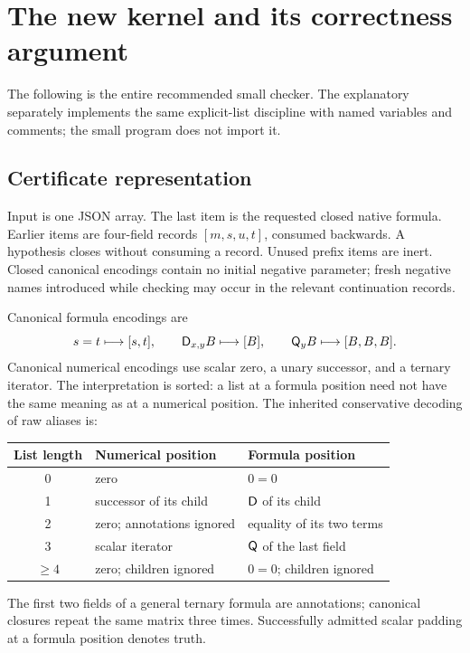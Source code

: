 \section{The new kernel and its correctness argument}
\label{sec:kernel}

The following is the entire recommended small checker. The explanatory
 separately implements the same explicit-list
discipline with named variables and comments; the small program does not
import it.


\subsection{Certificate representation}

Input is one JSON array. The last item is the requested closed native
formula. Earlier items are four-field records $[m,s,u,t]$, consumed
backwards. A hypothesis closes without consuming a record. Unused prefix
items are inert. Closed canonical encodings contain no initial negative
parameter; fresh negative names introduced while checking may occur in
the relevant continuation records.

Canonical formula encodings are
\[
  s=t\longmapsto[s,t],\qquad
  \mathsf D_{x,y}B\longmapsto[B],\qquad
  \mathsf Q_yB\longmapsto[B,B,B].
\]
Canonical numerical encodings use scalar zero, a unary successor, and
a ternary iterator. The interpretation is sorted: a list at a formula
position need not have the same meaning as at a numerical position.
The inherited conservative decoding of raw aliases is:
\begin{center}
\small
\begin{tabular}{cll}
\toprule
List length & Numerical position & Formula position\\
\midrule
0 & zero & $0=0$\\
1 & successor of its child & $\mathsf D$ of its child\\
2 & zero; annotations ignored & equality of its two terms\\
3 & scalar iterator & $\mathsf Q$ of the last field\\
$\geq4$ & zero; children ignored & $0=0$; children ignored\\
\bottomrule
\end{tabular}
\end{center}
The first two fields of a general ternary formula are annotations;
canonical closures repeat the same matrix three times. Successfully
admitted scalar padding at a formula position denotes truth.

